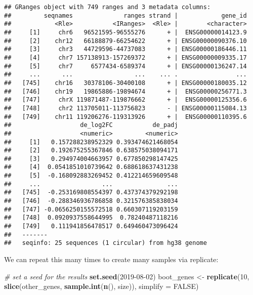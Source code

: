 \documentclass[
  9pt,
  a4paper,
]{extarticle}
\newenvironment{Shaded}{\begin{snugshade}}{\end{snugshade}}
\newcommand{\CommentTok}[1]{\textcolor[rgb]{0.56,0.35,0.01}{\textit{#1}}}
\newcommand{\DataTypeTok}[1]{\textcolor[rgb]{0.13,0.29,0.53}{#1}}
\newcommand{\DecValTok}[1]{\textcolor[rgb]{0.00,0.00,0.81}{#1}}
\newcommand{\KeywordTok}[1]{\textcolor[rgb]{0.13,0.29,0.53}{\textbf{#1}}}
\newcommand{\NormalTok}[1]{#1}
\newcommand{\OtherTok}[1]{\textcolor[rgb]{0.56,0.35,0.01}{#1}}
\newcommand{\StringTok}[1]{\textcolor[rgb]{0.31,0.60,0.02}{#1}}
\begin{document}
\begin{verbatim}
## GRanges object with 749 ranges and 3 metadata columns:
##         seqnames              ranges strand |            gene_id
##            <Rle>           <IRanges>  <Rle> |        <character>
##     [1]     chr6   96521595-96555276      + |  ENSG00000014123.9
##     [2]    chr12   66188879-66254622      + | ENSG00000090376.10
##     [3]     chr3   44729596-44737083      + | ENSG00000186446.11
##     [4]     chr7 157138913-157269372      + | ENSG00000009335.17
##     [5]     chr7     6577434-6589374      + | ENSG00000136247.14
##     ...      ...                 ...    ... .                ...
##   [745]    chr16   30378106-30400108      + | ENSG00000180035.12
##   [746]    chr19   19865886-19894674      + |  ENSG00000256771.3
##   [747]     chrX 119871487-119876662      + |  ENSG00000125356.6
##   [748]     chr2 113705011-113756823      - | ENSG00000115084.13
##   [749]    chr11 119206276-119313926      + |  ENSG00000110395.6
##                   de_log2FC           de_padj
##                   <numeric>         <numeric>
##     [1]   0.157288238952329 0.393474621468054
##     [2]   0.192675255367846 0.638575038094171
##     [3]   0.294974004663957 0.677850298147425
##     [4]  0.0541851010739642 0.688618637431238
##     [5]  -0.168092883269452 0.412214659609548
##     ...                 ...               ...
##   [745]  -0.253169808554397 0.437374379292198
##   [746]  -0.288346936786858 0.321576385838034
##   [747] -0.0656250155572518 0.660307119203159
##   [748]  0.0920937558644995  0.78240487118216
##   [749]   0.111941856478517 0.649460473096424
##   -------
##   seqinfo: 25 sequences (1 circular) from hg38 genome
\end{verbatim}

We can repeat this many times to create many samples via replicate:

\begin{Shaded}
\begin{Highlighting}[]
\CommentTok{# set a seed for the results}
\KeywordTok{set.seed}\NormalTok{(}\DecValTok{2019-08-02}\NormalTok{)}
\NormalTok{boot_genes <-}\StringTok{ }\KeywordTok{replicate}\NormalTok{(}\DecValTok{10}\NormalTok{,}
                        \KeywordTok{slice}\NormalTok{(other_genes, }\KeywordTok{sample.int}\NormalTok{(}\KeywordTok{n}\NormalTok{(), size)),}
                        \DataTypeTok{simplify =} \OtherTok{FALSE}\NormalTok{)}
\end{Highlighting}
\end{Shaded}
\end{document}
